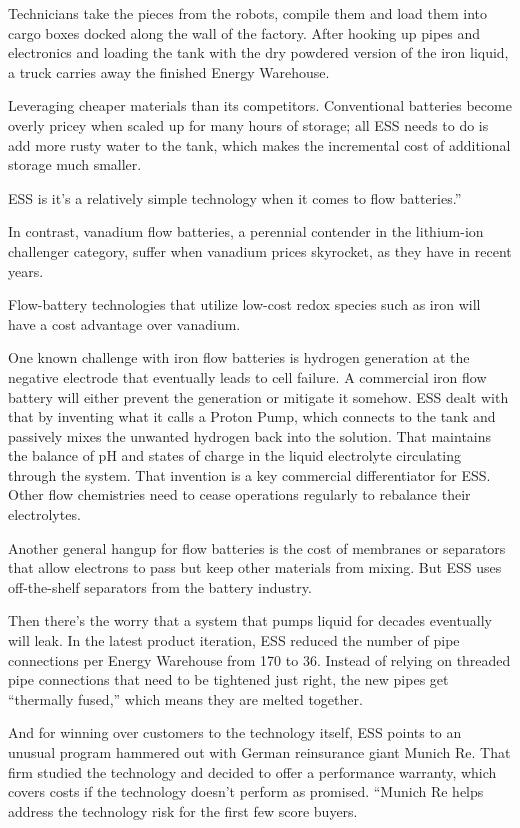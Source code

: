 \documentclass[
]{book}
\begin{document}
Technicians take the pieces from the robots, compile them and load them into cargo boxes docked along the wall of the factory. After hooking up pipes and electronics and loading the tank with the dry powdered version of the iron liquid, a truck carries away the finished Energy Warehouse.

Leveraging cheaper materials than its competitors.
Conventional batteries become overly pricey when scaled up for many hours of storage; all ESS needs to do is add more rusty water to the tank, which makes the incremental cost of additional storage much smaller.

ESS is it's a relatively simple technology when it comes to flow batteries.''

In contrast, vanadium flow batteries, a perennial contender in the lithium-ion challenger category, suffer when vanadium prices skyrocket, as they have in recent years.

Flow-battery technologies that utilize low-cost redox species such as iron will have a cost advantage over vanadium.

One known challenge with iron flow batteries is hydrogen generation at the negative electrode that eventually leads to cell failure.
A commercial iron flow battery will either prevent the generation or mitigate it somehow.
ESS dealt with that by inventing what it calls a Proton Pump, which connects to the tank and passively mixes the unwanted hydrogen back into the solution. That maintains the balance of pH and states of charge in the liquid electrolyte circulating through the system.
That invention is a key commercial differentiator for ESS.
Other flow chemistries need to cease operations regularly to rebalance their electrolytes.

Another general hangup for flow batteries is the cost of membranes or separators that allow electrons to pass but keep other materials from mixing. But ESS uses off-the-shelf separators from the battery industry.

Then there's the worry that a system that pumps liquid for decades eventually will leak.
In the latest product iteration, ESS reduced the number of pipe connections per Energy Warehouse from 170 to 36. Instead of relying on threaded pipe connections that need to be tightened just right, the new pipes get ``thermally fused,'' which means they are melted together.

And for winning over customers to the technology itself, ESS points to an unusual program hammered out with German reinsurance giant Munich Re. That firm studied the technology and decided to offer a performance warranty, which covers costs if the technology doesn't perform as promised.
``Munich Re helps address the technology risk for the first few score buyers.
\end{document}
